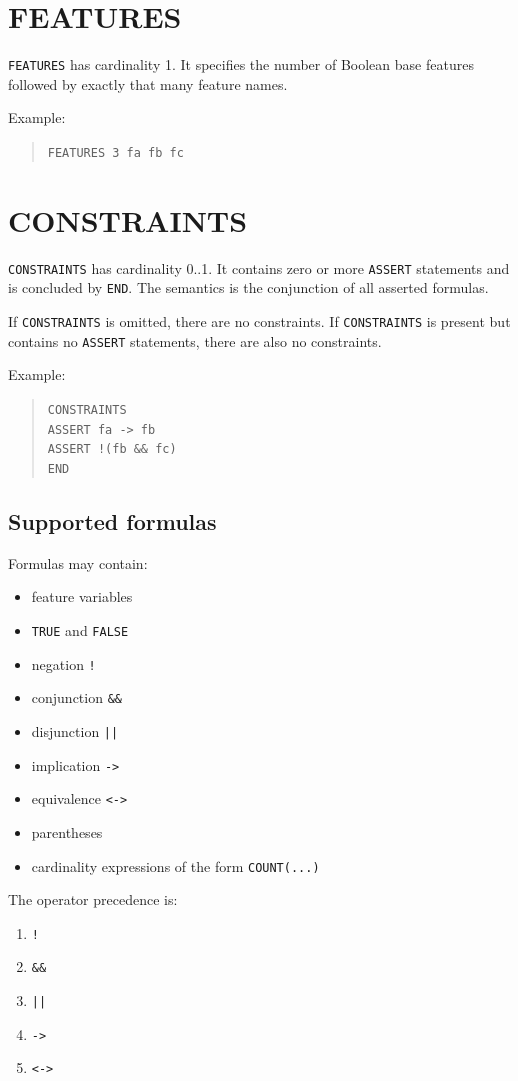 \documentclass[english,10pt,a4paper,draft,onecolumn]{article}
\begin{document}
\section{FEATURES}
\texttt{FEATURES} has cardinality 1. It specifies the number of Boolean base features followed by exactly that many feature names.

Example:
\begin{quote}
\texttt{FEATURES 3 fa fb fc}
\end{quote}

\section{CONSTRAINTS}
\texttt{CONSTRAINTS} has cardinality 0..1. It contains zero or more \texttt{ASSERT} statements and is concluded by \texttt{END}. The semantics is the conjunction of all asserted formulas.

If \texttt{CONSTRAINTS} is omitted, there are no constraints. If \texttt{CONSTRAINTS} is present but contains no \texttt{ASSERT} statements, there are also no constraints.

Example:
\begin{quote}
\texttt{CONSTRAINTS\\
ASSERT fa -> fb\\
ASSERT !(fb \&\& fc)\\
END}
\end{quote}

\subsection{Supported formulas}
Formulas may contain:
\begin{itemize}[leftmargin=*]
\item feature variables
\item \texttt{TRUE} and \texttt{FALSE}
\item negation \texttt{!}
\item conjunction \texttt{\&\&}
\item disjunction \texttt{||}
\item implication \texttt{->}
\item equivalence \texttt{<->}
\item parentheses
\item cardinality expressions of the form \texttt{COUNT(...)}
\end{itemize}

The operator precedence is:
\begin{enumerate}[leftmargin=*]
\item \texttt{!}
\item \texttt{\&\&}
\item \texttt{||}
\item \texttt{->}
\item \texttt{<->}
\end{enumerate}
\end{document}
